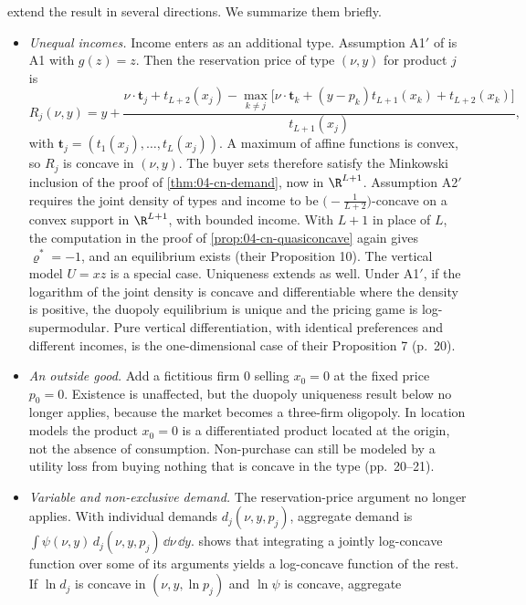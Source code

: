 \citet[Section 8]{CaplinNalebuff1991} extend the result in several directions. We summarize them briefly.
\begin{itemize}
  \item \emph{Unequal incomes.} Income enters as an additional type. Assumption A1$'$ of
  \citet[p.~20]{CaplinNalebuff1991} is A1 with $g(z) = z$. Then the reservation price of type $(\nu, y)$ for
  product $j$ is
  \[
    R_j(\nu, y) = y + \frac{\nu\cdot\bm{t}_j + t_{L+2}(x_j) - \max_{k \neq j}\bigl[\nu\cdot\bm{t}_k + (y - p_k)t_{L+1}(x_k) + t_{L+2}(x_k)\bigr]}{t_{L+1}(x_j)},
  \]
  with $\bm{t}_j = (t_1(x_j), \dots, t_L(x_j))$. A maximum of affine functions is convex, so $R_j$ is concave in
  $(\nu, y)$. The buyer sets therefore satisfy the Minkowski inclusion of the proof of \cref{thm:04-cn-demand},
  now in $\R^{L+1}$. Assumption A2$'$ requires the joint density of types and income to be
  $\bigl(-\frac{1}{L+2}\bigr)$-concave on a convex support in $\R^{L+1}$, with bounded income. With $L + 1$ in
  place of $L$, the computation in the proof of \cref{prop:04-cn-quasiconcave} again gives $\varrho^* = -1$, and an
  equilibrium exists (their Proposition 10). The vertical model $U = xz$
  \citep{GabszewiczThisse1979,ShakedSutton1982} is a special case. Uniqueness extends as well. Under A1$'$, if the
  logarithm of the joint density is concave and differentiable where the density is positive, the duopoly
  equilibrium is unique and the pricing game is log-supermodular. Pure vertical differentiation, with identical
  preferences and different incomes, is the one-dimensional case of their Proposition 7 (p.~20).
  \item \emph{An outside good.} Add a fictitious firm 0 selling $x_0 = 0$ at the fixed price $p_0 = 0$. Existence
  is unaffected, but the duopoly uniqueness result below no longer applies, because the market becomes a
  three-firm oligopoly. In location models the product $x_0 = 0$ is a differentiated product located at the origin,
  not the absence of consumption. Non-purchase can still be modeled by a utility loss from buying nothing that is
  concave in the type (pp.~20--21).
  \item \emph{Variable and non-exclusive demand.} The reservation-price argument no longer applies. With
  individual demands $d_j(\nu, y, p_j)$, aggregate demand is $\int \psi(\nu, y)\,d_j(\nu, y, p_j)\,\dd\nu\,\dd y$.
  \citet{Prekopa1973} shows that integrating a jointly log-concave function over some of its arguments yields a
  log-concave function of the rest. If $\ln d_j$ is concave in $(\nu, y, \ln p_j)$ and $\ln\psi$ is concave, aggregate

\end{itemize}
